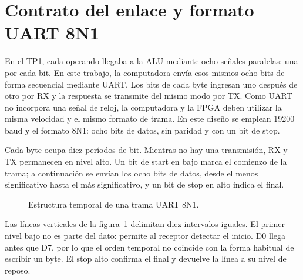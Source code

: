 \section{Contrato del enlace y formato UART 8N1}

En el TP1, cada operando llegaba a la ALU mediante ocho señales
paralelas: una por cada bit. En este trabajo, la computadora envía
esos mismos ocho bits de forma secuencial mediante UART. Los bits de
cada byte ingresan uno después de otro por RX y la respuesta se
transmite del mismo modo por TX. Como UART no incorpora una señal de
reloj, la computadora y la FPGA deben utilizar la misma velocidad y
el mismo formato de trama. En este diseño se emplean \num{19200} baud
y el formato 8N1: ocho bits de datos, sin paridad y con un bit de stop.

Cada byte ocupa diez períodos de bit. Mientras no hay una
transmisión, RX y TX permanecen en nivel alto. Un bit de start en
bajo marca el comienzo de la trama; a continuación se envían los ocho
bits de datos, desde el menos significativo hasta el más
significativo, y un bit de stop en alto indica el final.

\begin{figure}[H]
  \centering
  \caption{Estructura temporal de una trama UART 8N1.}%
  \label{fig:trama-uart}
\end{figure}

Las líneas verticales de la figura~\ref{fig:trama-uart} delimitan
diez intervalos iguales. El primer nivel bajo no es parte del dato:
permite al receptor detectar el inicio. D0 llega antes que D7, por lo
que el orden temporal no coincide con la forma habitual de escribir
un byte. El stop alto confirma el final y devuelve la línea a su
nivel de reposo.

